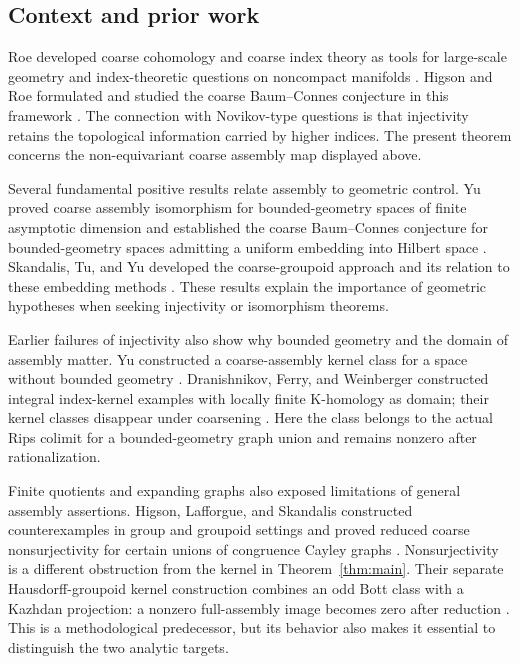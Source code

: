 \subsection{Context and prior work}

Roe developed coarse cohomology and coarse index theory as tools for
large-scale geometry and index-theoretic questions on noncompact manifolds
\cite{Roe93}. Higson and Roe formulated and studied the coarse Baum--Connes
conjecture in this framework \cite{HR95}. The connection with Novikov-type
questions is that injectivity retains the topological information carried
by higher indices. The present theorem concerns the non-equivariant coarse
assembly map displayed above.

Several fundamental positive results relate assembly to geometric control.
Yu proved coarse assembly isomorphism for bounded-geometry spaces of finite
asymptotic dimension \cite[Theorem~7.1]{Yu98} and established the coarse
Baum--Connes conjecture for
bounded-geometry spaces admitting a uniform embedding into Hilbert space
\cite{Yu00}. Skandalis, Tu, and Yu developed the coarse-groupoid approach
and its relation to these embedding methods \cite{STY02}. These results
explain the importance of geometric hypotheses when seeking injectivity or
isomorphism theorems.

Earlier failures of injectivity also show why bounded geometry and the
domain of assembly matter. Yu constructed a coarse-assembly kernel class
for a space without bounded geometry \cite[Section~8, Proposition~8.1]{Yu98}.
Dranishnikov, Ferry, and Weinberger constructed integral index-kernel
examples with locally finite K-homology as domain; their kernel classes
disappear under coarsening \cite[Section~6, Remark~6.2]{DFW03}.
Here the class belongs to the actual Rips colimit for a bounded-geometry
graph union and remains nonzero after rationalization.

Finite quotients and expanding graphs also exposed limitations of general
assembly assertions. Higson, Lafforgue, and Skandalis constructed
counterexamples in group and groupoid settings and proved reduced coarse
nonsurjectivity for certain unions of congruence Cayley graphs
\cite[Section~6]{HLS02}. Nonsurjectivity is a different obstruction from
the kernel in Theorem~\ref{thm:main}. Their separate Hausdorff-groupoid
kernel construction combines an odd Bott class with a Kazhdan projection:
a nonzero full-assembly image becomes zero after reduction
\cite[Section~5]{HLS02}. This is a methodological predecessor, but its
behavior also makes it essential to distinguish the two analytic targets.

